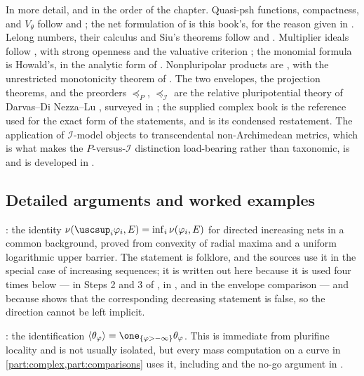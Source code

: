 In more detail, and in the order of the chapter.  Quasi-psh functions,
compactness, and $V_\theta$ follow \cite{GZ17} and
\cite[\S1]{BEGZ10}; the net formulation of
 is this book's, for the reason given
in .  Lelong numbers, their calculus and Siu's
theorems follow \cite[Chapter~III]{DemBook} and \cite{Siu74,Dem93}.
Multiplier ideals follow \cite{Nad90,DemBook}, with strong openness
\cite{GZ15} and the valuative criterion \cite{Bou17}; the monomial
formula is Howald's, in the analytic form of \cite{Guenancia12}.
Nonpluripolar products are \cite{BEGZ10}, with the unrestricted
monotonicity theorem of \cite{DDNL18mono}.  The two envelopes, the
projection theorems, and the preorders $\preceq_P$,
$\preceq_{\mathcal I}$ are the relative pluripotential theory of
Darvas--Di Nezza--Lu \cite{DDNL18mono,DDNL18big,DDNL18fullmass,%
DDNLmetric}, surveyed in \cite{DDNLsurv}; the supplied complex book
\cite{XiaBook} is the reference used for the exact form of the
statements, and  is its condensed
restatement.  The application of $\mathcal I$-model objects to
transcendental non-Archimedean metrics, which is what makes the
$P$-versus-$\mathcal I$ distinction load-bearing rather than
taxonomic, is \cite{DXZ23,DX24,Xia23Operations} and is developed in
.

\subsection{Detailed arguments and worked examples}
\label{sec:ch51-additions}

: the identity
$\nu(\uscsup_i\varphi_i,E)=\inf_i\nu(\varphi_i,E)$ for directed
increasing nets in a common background, proved from convexity of radial
maxima and a uniform logarithmic upper barrier.  The statement is
folklore, and the sources use it in the special case of increasing
sequences; it is written out here because it is used four times below ---
in Steps 2 and 3 of , in
, and in the envelope comparison
 --- and because
 shows that the corresponding
decreasing statement is false, so the direction cannot be left implicit.

: the identification
$\langle\theta_\varphi\rangle
=\one_{\{\varphi>-\infty\}}\theta_\varphi$.  This is immediate from
plurifine locality and is not usually isolated, but every mass
computation on a curve in \cref{part:complex,part:comparisons} uses it,
including  and the no-go argument in
.

